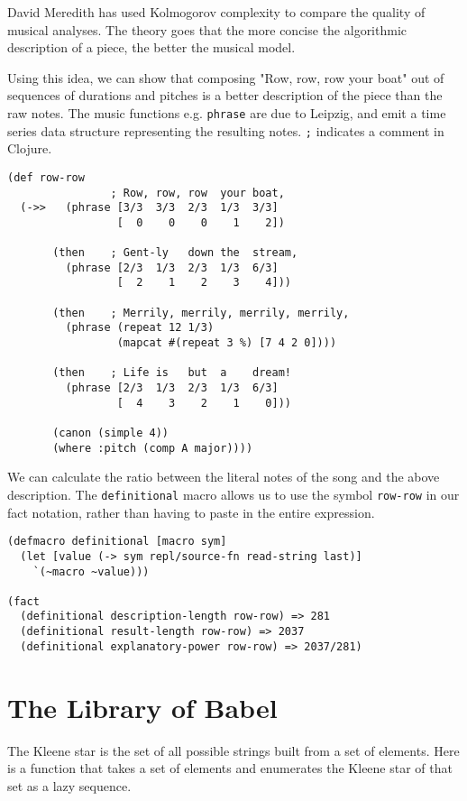 \documentclass[numbers]{sigplanconf}
\begin{document}
David Meredith has used Kolmogorov complexity to compare the quality of musical analyses\cite{Analysis by Compression}.
The theory goes that the
more concise the algorithmic description of a piece, the better the musical model.

Using this idea, we can show that composing "Row, row, row your boat" out of sequences of durations and pitches
is a better description of the piece than the raw notes. The music functions e.g. \verb|phrase| are due to Leipzig,
and emit a time series data structure representing the resulting notes. \verb|;| indicates a comment in Clojure.

\begin{verbatim}
(def row-row
                ; Row, row, row  your boat,
  (->>   (phrase [3/3  3/3  2/3  1/3  3/3]
                 [  0    0    0    1    2])

       (then    ; Gent-ly   down the  stream,
         (phrase [2/3  1/3  2/3  1/3  6/3]
                 [  2    1    2    3    4]))

       (then    ; Merrily, merrily, merrily, merrily,
         (phrase (repeat 12 1/3)
                 (mapcat #(repeat 3 %) [7 4 2 0])))

       (then    ; Life is   but  a    dream!
         (phrase [2/3  1/3  2/3  1/3  6/3]
                 [  4    3    2    1    0]))

       (canon (simple 4))
       (where :pitch (comp A major))))
\end{verbatim}

We can calculate the ratio between the literal notes of the song and the above description.
The \verb|definitional| macro allows us to use the symbol \verb|row-row| in our fact notation, rather than
having to paste in the entire expression.

\begin{verbatim}
(defmacro definitional [macro sym]
  (let [value (-> sym repl/source-fn read-string last)]
    `(~macro ~value)))

(fact
  (definitional description-length row-row) => 281
  (definitional result-length row-row) => 2037
  (definitional explanatory-power row-row) => 2037/281)
\end{verbatim}

\section{The Library of Babel}

The Kleene star is the set of all possible strings built from a set of elements. Here is a function that takes a set of
elements and enumerates the Kleene star of that set as a lazy sequence.
\end{document}

